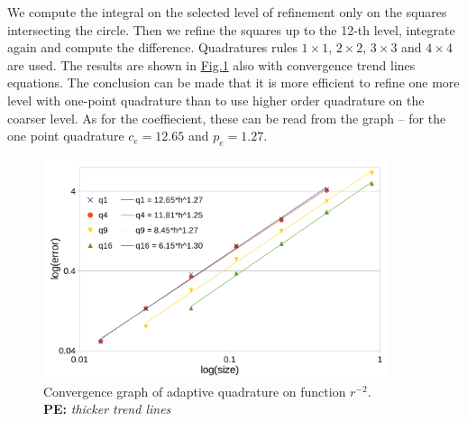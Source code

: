 \documentclass[preprint,12pt]{elsarticle}
\newcommand{\fig}[1]{\hyperref[#1]{Fig.\ref{#1}}}
\newcommand{\figpath}{../graphics/}
\newcommand{\notePE}[1]{{\color{Orange} \textbf{PE: } \textit{#1}}}
\begin{document}
We compute the integral on the selected level of refinement only on the squares intersecting the circle. Then
we refine the squares up to the 12-th level, integrate again and compute the difference. Quadratures rules
$1\times1$, $2\times2$, $3\times3$ and $4\times4$ are used. The results are shown in 
\fig{fig:adapt_integration_conv} also with convergence trend lines equations. The conclusion can be made
that it is more efficient to refine one more level with one-point quadrature than to use higher order 
quadrature on the coarser level. As for the coeffiecient, these can be read from the graph -- for the one point
quadrature $c_e=12.65$ and $p_e=1.27$.

\begin{figure}[!htb]
  \centering    
  \includegraphics[width=0.9\textwidth]{results/adapt_integration_conv.pdf}
  \caption[Adaptive quadrature convergence.]{Convergence graph of adaptive quadrature on function $r^{-2}$.
  \\ \notePE{thicker trend lines}}
  \label{fig:adapt_integration_conv}
\end{figure}
\end{document}
